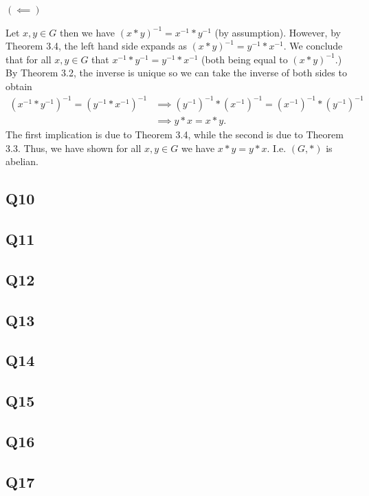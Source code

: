 \documentclass[12pt]{article}
\numberwithin{theorem}{section}
\numberwithin{equation}{section}
\numberwithin{remark}{section}
\numberwithin{definition}{section}
\numberwithin{theorem}{section}
\numberwithin{lemma}{section}
\numberwithin{example}{section}
\begin{document}
\noindent $\left(\impliedby\right)$ 

Let $x,y\in G$ then we have $\left(x*y\right)^{-1}=x^{-1}*y^{-1}$ (by assumption). However, by Theorem 3.4, the left hand side expands as $\left(x*y\right)^{-1}=y^{-1}*x^{-1}$. We conclude that for all $x,y\in G$ that $x^{-1}*y^{-1}=y^{-1}*x^{-1}$ (both being equal to $\left(x*y\right)^{-1}$.) By Theorem 3.2, the inverse is unique so we can take the inverse of both sides to obtain 
\begin{align*}
	\left(x^{-1}*y^{-1}\right)^{-1}=\left(y^{-1}*x^{-1}\right)^{-1} & \implies \left(y^{-1}\right)^{-1}* \left(x^{-1}\right)^{-1}=\left(x^{-1}\right)^{-1}* \left(y^{-1}\right)^{-1}\\
	&\implies y*x = x*y.
\end{align*}
The first implication is due to Theorem 3.4, while the second is due to Theorem  3.3. Thus, we have shown for all $x,y\in G$ we have $x*y=y*x$. I.e. $(G,*)$ is abelian. 

\subsection{Q10}

\subsection{Q11}

\subsection{Q12}

\subsection{Q13}

\subsection{Q14}

\subsection{Q15}

\subsection{Q16}

\subsection{Q17}
\end{document}
